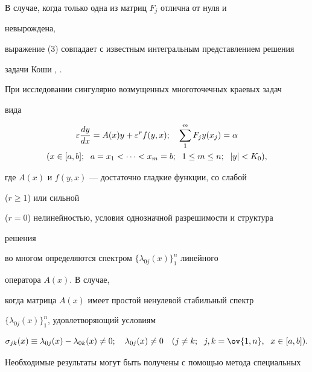  


\begin{note} 


В случае, когда только одна из матриц $F_j$ отлична от нуля и 


невырождена, 


выражение (3) совпадает с известным интегральным представлением решения 


задачи Коши \cite{3}, \cite{7}. 


\end{note} 


 


При исследовании сингулярно возмущенных многоточечных краевых задач 


вида 


\begin{gather} 


\varepsilon\frac{dy}{dx}=A(x)y+\varepsilon^r f(y,x);\quad 


\sum^m_1 F_j y(x_j)=\alpha \\


(x\in[a,b];\ \; a=x_1<\dotsb<x_m=b;\ \; 1\le m\le n; 


\ \; |y|<K_0), \notag


\end{gather} 


где $A(x)$ и $f(y,x)$ --- достаточно гладкие функции, со слабой 


($r\ge 1$) или сильной 


($r=0$) нелинейностью, условия однозначной разрешимости и структура 


решения 


во многом определяются спектром $\{\lambda_{0j}(x)\}^n_1$ линейного 


оператора $A(x)$. В случае, 


когда матрица $A(x)$ имеет простой ненулевой стабильный спектр 


$\{\lambda_{0j}(x)\}^n_1$, удовлетворяющий условиям 


\begin{equation} 


\sigma_{jk}(x)\equiv \lambda_{0j}(x)-\lambda_{0k}(x)\ne 0;\quad 


\lambda_{0j}(x)\ne 0\quad 


(j\ne k;\ \;j,k=\ov{1,n},\ \; x\in[a,b]). 


\end{equation} 


Необходимые результаты могут быть получены с помощью метода специальных 


